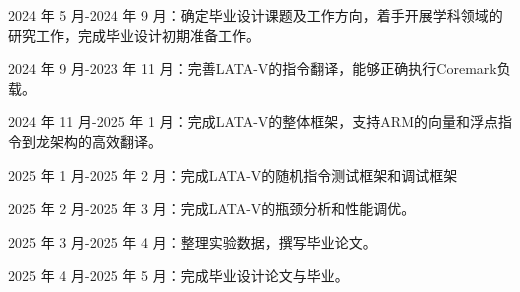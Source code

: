 2024  年 5  月-2024  年 9  月：确定毕业设计课题及工作方向，着手开展学科领域的研究工作，完成毕业设计初期准备工作。

2024  年 9  月-2023  年 11  月：完善LATA-V的指令翻译，能够正确执行Coremark负载。

2024  年 11  月-2025  年 1  月：完成LATA-V的整体框架，支持ARM的向量和浮点指令到龙架构的高效翻译。

2025  年 1  月-2025  年 2  月：完成LATA-V的随机指令测试框架和调试框架

2025  年 2  月-2025  年 3  月：完成LATA-V的瓶颈分析和性能调优。

2025  年 3  月-2025  年 4  月：整理实验数据，撰写毕业论文。

2025  年 4  月-2025  年 5  月：完成毕业设计论文与毕业。

\nocite{*}%
